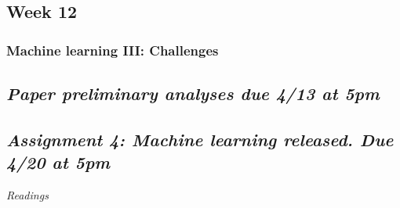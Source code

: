 \documentclass[
  10pt,
]{article}
\begin{document}
\hypertarget{week-12}{%
\subsection{Week 12}\label{week-12}}

\hypertarget{machine-learning-iii-challenges}{%
\subsubsection{Machine learning III:
Challenges}\label{machine-learning-iii-challenges}}

\hypertarget{paper-preliminary-analyses-due-413-at-5pm}{%
\subsection{\texorpdfstring{\emph{Paper preliminary analyses due 4/13 at
5pm}}{Paper preliminary analyses due 4/13 at 5pm}}\label{paper-preliminary-analyses-due-413-at-5pm}}

\hypertarget{assignment-4-machine-learning-released.-due-420-at-5pm}{%
\subsection{\texorpdfstring{\emph{Assignment 4: Machine learning
released. Due 4/20 at
5pm}}{Assignment 4: Machine learning released. Due 4/20 at 5pm}}\label{assignment-4-machine-learning-released.-due-420-at-5pm}}

\emph{Readings}
\end{document}
